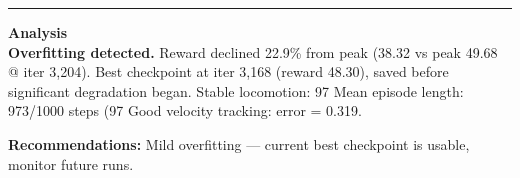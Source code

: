 \documentclass[a4paper,10pt]{article}
\begin{document}
\vspace{2pt}
\hrule
\vspace{2pt}

\footnotesize
\textbf{Analysis} \\[1pt]
\textbf{Overfitting detected.} Reward declined 22.9\% from peak (38.32 vs peak 49.68 @ iter 3,204).
Best checkpoint at iter 3,168 (reward 48.30), saved before significant degradation began.
Stable locomotion: 97%
Mean episode length: 973/1000 steps (97%
Good velocity tracking: error = 0.319.

\textbf{Recommendations:}
Mild overfitting --- current best checkpoint is usable, monitor future runs.
\end{document}
